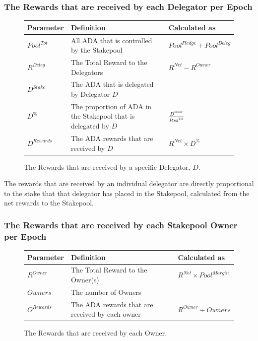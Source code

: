 \documentclass[11pt,a4paper,dvipsnames,twosided,final]{article}
\newcommand{\ada}{ADA{}}
\begin{document}
\subsubsection*{The Rewards that are received by each Delegator per Epoch}

\begin{figure}[h!]
\begin{center}
\begin{tabular}{||l|p{6cm}|l||}
  \hline \hline
\textbf{Parameter} & \textbf{Definition} & \textbf{Calculated as} \\\hline
${\textit{Pool}}^{Tot}$ & All \ada{} that is controlled by the Stakepool & ${\textit{Pool}}^\textit{Pledge} + {\textit{Pool}}^\textit{Deleg}$ \\\hline
$R^{Deleg}$ & The Total Reward to the Delegators & $R^{\textit{Net}} - R^\textit{Owner}$ \\\hline
$D^{Stake}$ & The \ada{} that is delegated by Delegator $D$ & \\\hline
$D^\%$ & The proportion of \ada{} in the Stakepool that is delegated by $D$ & $\frac{D^{Stake}}{Pool^{Tot}}$ \\\hline
$D^{Rewards}$ & The \ada{} rewards that are received by $D$ & $R^{\textit{Net}} \times D^\%$ \\\hline
\hline
\end{tabular}
\end{center}
\caption{The Rewards that are received by a specific Delegator, $D$.}
\end{figure}

\noindent
The rewards that are received by an individual delegator are directly proportional to the
stake that that delegator has placed in the Stakepool, calculated from the net rewards to the
Stakepool.

\clearpage
\subsubsection*{The Rewards that are received by each Stakepool Owner per Epoch}

\begin{figure}[h!]
\begin{center}
\begin{tabular}{||l|p{6cm}|l||}
  \hline \hline
\textbf{Parameter}  & \textbf{Definition} & \textbf{Calculated as} \\\hline
$R^\textit{Owner}$ & The Total Reward to the Owner(s) & $R^{\textit{Net}} \times {\textit{Pool}}^{\textit{Margin}} $ \\\hline
$\textit{Owners}$ & The number of Owners & \\\hline
$O^{Rewards}$ & The \ada{} rewards that are received by each owner & $R^\textit{Owner} \div \textit{Owners}$ \\\hline
\hline
\end{tabular}
\end{center}
\caption{The Rewards that are received by each Owner.}
\end{figure}
\end{document}
